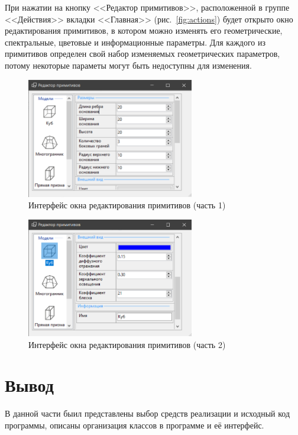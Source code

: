 При нажатии на кнопку <<Редактор примитивов>>, расположенной в группе <<Действия>> вкладки <<Главная>> (рис.~\ref{fig:actions}) будет открыто окно редактирования примитивов, в котором можно изменять его геометрические, спектральные, цветовые и информационные параметры. Для каждого из примитивов определен свой набор изменяемых геометрических параметров, потому некоторые параметы могут быть недоступны для изменения.
\clearpage
\begin{figure}[h] 
	\centering
	\includegraphics[width=0.65\textwidth]{images/model-editor1.png}
	\caption{Интерфейс окна редактирования примитивов (часть 1)} 
	\label{fig:model-editor1} 
\end{figure}
\begin{figure}[h] 
	\centering
	\includegraphics[width=0.65\textwidth]{images/model-editor2.png}
	\caption{Интерфейс окна редактирования примитивов (часть 2)} 
	\label{fig:model-editor2} 
\end{figure}

\section{Вывод}

В данной части быил представлены выбор средств реализации и исходный код программы, описаны организация классов в программе и её интерфейс.

\clearpage
